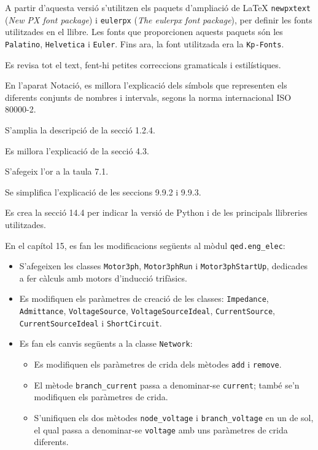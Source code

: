 A partir d'aquesta versió s'utilitzen els paquets d'ampliació de \LaTeX{}
\texttt{newpxtext} (\textit{New PX font package}) i \texttt{eulerpx} (\textit{The eulerpx font package}), per definir les fonts utilitzades en el llibre. Les fonts que proporcionen aquests paquets són les \texttt{Palatino}, \texttt{Helvetica} i \AmS{} \texttt{Euler}.
Fins ara, la font utilitzada era la \texttt{Kp-Fonts}.

Es revisa tot el text, fent-hi petites correccions gramaticals i estilístiques.

En l'aparat Notació, es millora l'explicació dels símbols que representen els diferents conjunts de nombres i intervals, segons la norma internacional ISO 80000-2.

S'amplia la descripció de la secció 1.2.4.

Es millora l'explicació de la secció 4.3.

S'afegeix l'or a la taula 7.1.

Se simplifica l'explicació de les seccions 9.9.2 i 9.9.3.

Es crea la secció 14.4 per indicar la versió de Python i de les principals llibreries utilitzades. 


En el capítol 15, es fan les modificacions següents al mòdul  \texttt{qed.eng\_elec}:
\begin{itemize}
	\item S'afegeixen les classes  \texttt{Motor3ph}, \texttt{Motor3phRun} i 
	\texttt{Motor3phStartUp}, dedicades a fer càlculs amb motors d'inducció trifàsics.
	\item Es modifiquen els paràmetres de creació de les classes: \texttt{Impedance}, \texttt{Admittance}, \texttt{VoltageSource}, \texttt{VoltageSourceIdeal}, \texttt{CurrentSource}, \texttt{CurrentSourceIdeal} i \texttt{ShortCircuit}.
	\item Es fan els canvis següents a la classe \texttt{Network}:
	\begin{itemize}
		\item Es modifiquen els paràmetres de crida dels mètodes \texttt{add} i \texttt{remove}.
		\item  El mètode \texttt{branch\_current} passa a denominar-se \texttt{current}; també se'n modifiquen els paràmetres de crida.
		\item S'unifiquen els dos mètodes \texttt{node\_voltage} i \texttt{branch\_voltage} en un de sol, el qual passa a denominar-se \texttt{voltage} amb uns paràmetres de crida diferents. 
	\end{itemize}
\end{itemize}


